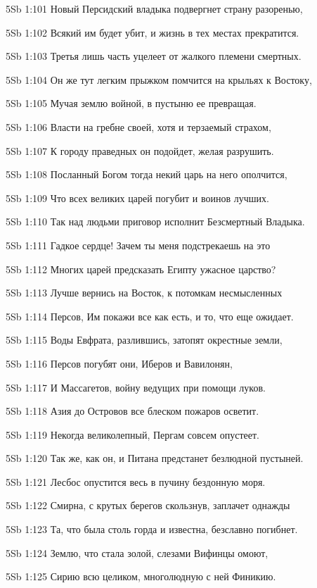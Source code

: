 \vs 5Sb 1:101 Новый Персидский владыка подвергнет страну разоренью, 

\vs 5Sb 1:102 Всякий им будет убит, и жизнь в тех местах прекратится. 

\vs 5Sb 1:103 Третья лишь часть уцелеет от жалкого племени смертных.

\vs 5Sb 1:104 Он же тут легким прыжком помчится на крыльях к Востоку, 

\vs 5Sb 1:105 Мучая землю войной, в пустыню ее превращая. 

\vs 5Sb 1:106 Власти на гребне своей, хотя и терзаемый страхом, 

\vs 5Sb 1:107 К городу праведных он подойдет, желая разрушить. 

\vs 5Sb 1:108 Посланный Богом тогда некий царь на него ополчится, 

\vs 5Sb 1:109 Что всех великих царей погубит и воинов лучших. 

\vs 5Sb 1:110 Так над людьми приговор исполнит Безсмертный Владыка.

\vs 5Sb 1:111 Гадкое сердце! Зачем ты меня подстрекаешь на это  

\vs 5Sb 1:112 Многих царей предсказать Египту ужасное царство? 

\vs 5Sb 1:113 Лучше вернись на Восток, к потомкам несмысленных

\vs 5Sb 1:114 Персов, Им покажи все как есть, и то, что еще ожидает.

\vs 5Sb 1:115 Воды Евфрата, разлившись, затопят окрестные земли, 

\vs 5Sb 1:116 Персов погубят они, Иберов и Вавилонян, 

\vs 5Sb 1:117 И Массагетов, войну ведущих при помощи луков. 

\vs 5Sb 1:118 Азия до Островов все блеском пожаров осветит. 

\vs 5Sb 1:119 Некогда великолепный, Пергам совсем опустеет.

\vs 5Sb 1:120 Так же, как он, и Питана предстанет безлюдной пустыней. 

\vs 5Sb 1:121 Лесбос опустится весь в пучину бездонную моря. 

\vs 5Sb 1:122 Смирна, с крутых берегов скользнув, заплачет однажды  

\vs 5Sb 1:123 Та, что была столь горда и известна, безславно погибнет. 

\vs 5Sb 1:124 Землю, что стала золой, слезами Вифинцы омоют,

\vs 5Sb 1:125 Сирию всю целиком, многолюдную с ней Финикию. 

